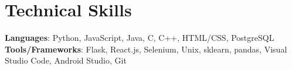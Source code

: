\documentclass[letterpaper,11pt]{article}
\begin{document}
\section{Technical Skills}
\begin{itemize}[leftmargin=0.15in, label={}]
    \small{\item{
                    \textbf{Languages}{: Python, JavaScript, Java, C, C++, HTML/CSS, PostgreSQL} \\
                    \textbf{Tools/Frameworks}{: Flask, React.js, Selenium, Unix, sklearn, pandas, Visual Studio Code, Android Studio, Git} \\
              }}
\end{itemize}
\vspace{-16pt}
\end{document}
